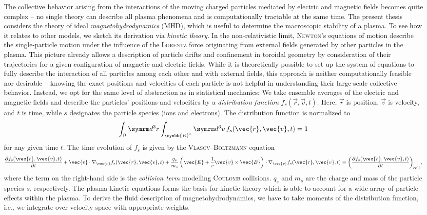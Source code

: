 The collective behavior arising from the interactions of the moving charged particles mediated by electric and magnetic fields becomes quite complex -- no single theory can describe all plasma phenomena and is computationally tractable at the same time. The present thesis considers the theory of ideal \emph{magnetohydrodynamics} (MHD), which is useful to determine the macroscopic stability of a plasma. To see how it relates to other models, we sketch its derivation via \emph{kinetic theory}. In the non-relativistic limit, \textsc{Newton}'s equations of motion describe the single-particle motion under the influence of the \textsc{Lorentz} force originating from external fields generated by other particles in the plasma. This picture already allows a description of particle drifts and confinement in toroidal geometry by consideration of their trajectories for a given configuration of magnetic and electric fields. While it is theoretically possible to set up the system of equations to fully describe the interaction of all particles among each other and with external fields, this approach is neither computationally feasible nor desirable -- knowing the exact positions and velocities of each particle is not helpful in understanding their large-scale collective behavior. Instead, we opt for the same level of abstraction as in statistical mechanics: We take ensemble averages of the electric and magnetic fields and describe the particles' positions and velocities by a \emph{distribution function} $f_{s} (\vec{r}, \vec{v}, t)$. Here, $\vec{r}$ is position, $\vec{v}$ is velocity, and $t$ is time, while $s$ designates the particle species (ions and electrons). The distribution function is normalized to
\begin{gather}
  \int_{\Omega} \diff^{3} r \int_{\symbb{R}^{3}} \diff^{3} v \, f_{s} (\vec{r}, \vec{v}, t) = 1
\end{gather}
for any given time $t$. The time evolution of $f_{s}$ is given by the \textsc{Vlasov}--\textsc{Boltzmann} equation
\begin{gather}
  \pd[f_{s} (\vec{r}, \vec{v}, t)]{t} + \vec{v} \cdot \grad_{\vec{r}} f_{s} (\vec{r}, \vec{v}, t) + \frac{q_{s}}{m_{s}} \left ( \vec{E} + \frac{1}{c} \vec{v} \times \vec{B} \right ) \cdot \grad_{\vec{v}} f_{s} (\vec{r}, \vec{v}, t) = \left ( \pd[f_{s} (\vec{r}, \vec{v}, t)]{t} \right )_{\text{coll}},
\end{gather}
where the term on the right-hand side is the \emph{collision term} modelling \textsc{Coulomb} collisions. $q_{s}$ and $m_{s}$ are the charge and mass of the particle species $s$, respectively. The plasma kinetic equations forms the basis for kinetic theory which is able to account for a wide array of particle effects within the plasma. To derive the fluid description of magnetohydrodynamics, we have to take moments of the distribution function, i.e., we integrate over velocity space with appropriate weights.

